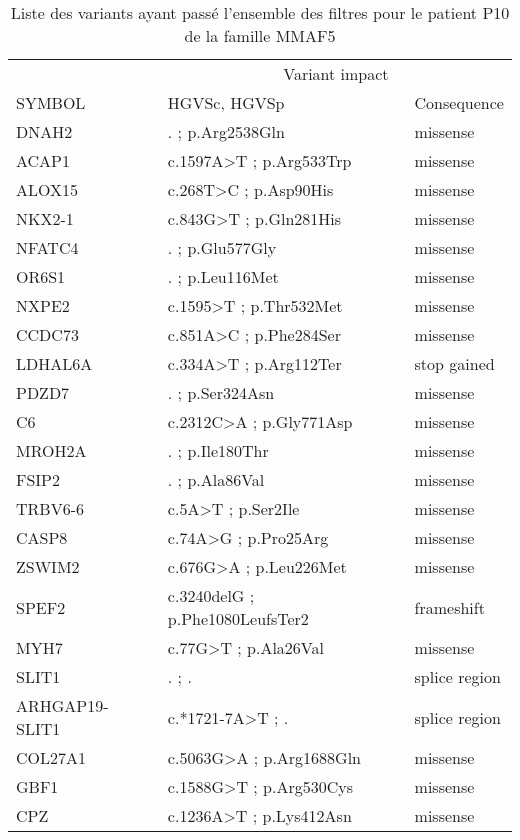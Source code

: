 \documentclass[12pt,twoside]{reedthesis}
\theoremstyle{definition}
\theoremstyle{definition}
\theoremstyle{remark}
\begin{document}
  \begin{longtable}[t]{lll}
  \caption{\label{tab:tabmmaf5}Liste des variants ayant passé l'ensemble des filtres pour le patient P10 de la famille MMAF5}\\
  \toprule
  \multicolumn{1}{c}{ } & \multicolumn{2}{c}{Variant impact} \\
  \cmidrule(l{2pt}r{2pt}){2-3}
  SYMBOL & HGVSc, HGVSp & Consequence\\
  \midrule
  DNAH2 & . ; p.Arg2538Gln & missense\\
  ACAP1 & c.1597A>T ; p.Arg533Trp & missense\\
  ALOX15 & c.268T>C ; p.Asp90His & missense\\
  NKX2-1 & c.843G>T ; p.Gln281His & missense\\
  NFATC4 & . ; p.Glu577Gly & missense\\
  \addlinespace
  OR6S1 & . ; p.Leu116Met & missense\\
  NXPE2 & c.1595>T ; p.Thr532Met & missense\\
  CCDC73 & c.851A>C ; p.Phe284Ser & missense\\
  LDHAL6A & c.334A>T ; p.Arg112Ter & stop gained\\
  PDZD7 & . ; p.Ser324Asn & missense\\
  \addlinespace
  C6 & c.2312C>A ; p.Gly771Asp & missense\\
  MROH2A & . ; p.Ile180Thr & missense\\
  FSIP2 & . ; p.Ala86Val & missense\\
  TRBV6-6 & c.5A>T ; p.Ser2Ile & missense\\
  CASP8 & c.74A>G ; p.Pro25Arg & missense\\
  \addlinespace
  ZSWIM2 & c.676G>A ; p.Leu226Met & missense\\
  SPEF2 & c.3240delG ; p.Phe1080LeufsTer2 & frameshift\\
  MYH7 & c.77G>T ; p.Ala26Val & missense\\
  SLIT1 & . ; . & splice region\\
  ARHGAP19-SLIT1 & c.*1721-7A>T ; . & splice region\\
  \addlinespace
  COL27A1 & c.5063G>A ; p.Arg1688Gln & missense\\
  GBF1 & c.1588G>T ; p.Arg530Cys & missense\\
  CPZ & c.1236A>T ; p.Lys412Asn & missense\\
  \bottomrule
  \end{longtable}
  
\end{document}
